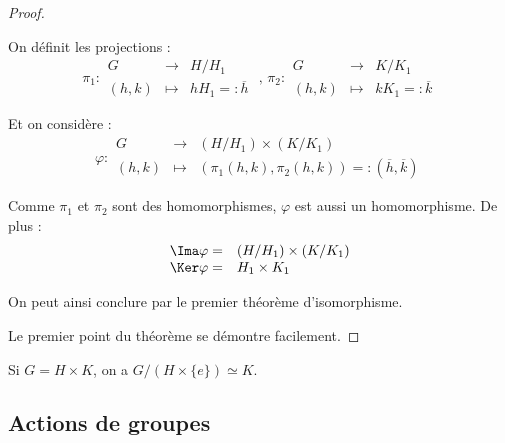 \begin{proof}\ 

On définit les projections :
\begin{equation*}
\pi_1 : 
\begin{array}{rcl}
G     & \longrightarrow & H/H_1 \\
(h,k) & \longmapsto     & hH_1 =: \overline{h}
\end{array}
\text{ , } \pi_2 : 
\begin{array}{rcl}
G     & \longrightarrow & K/K_1 \\
(h,k) & \longmapsto     & kK_1 =: \overline{k}
\end{array}
\end{equation*}

Et on considère :
\begin{equation*}
\varphi : 
\begin{array}{rcl}
G     & \longrightarrow & (H/H_1) \times (K/K_1) \\
(h,k) & \longmapsto     & (\pi_1(h,k), \pi_2(h,k)) =:
(\overline{h},\overline{k})
\end{array}
\end{equation*}

Comme $\pi_1$ et $\pi_2$ sont des homomorphismes, $\varphi$ est aussi un
homomorphisme. De plus :
\begin{equation*}
\begin{array}{rl}
 \Ima\varphi =& (H/H_1) \times (K/K_1) \\
 \Ker\varphi=& H_1 \times K_1
\end{array}
\end{equation*}

On peut ainsi conclure par le premier théorème d'isomorphisme.

Le premier point du théorème se démontre facilement.
\end{proof}

\begin{example}[Application]
 Si $G = H\times K$, on a $G/(H\times \{e\}) \simeq K$.
\end{example}

\subsection{Actions de groupes}
\vspace{0.5em}

